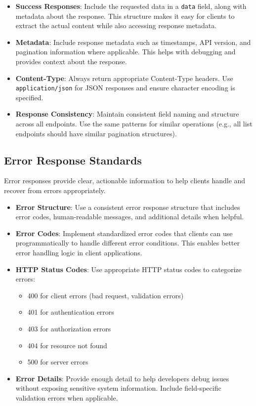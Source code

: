 \documentclass[12pt]{article}
\begin{document}
\begin{itemize}
    \item \textbf{Success Responses}: Include the requested data in a \texttt{data} field, along with metadata about the response. This structure makes it easy for clients to extract the actual content while also accessing response metadata.
    
    \item \textbf{Metadata}: Include response metadata such as timestamps, API version, and pagination information where applicable. This helps with debugging and provides context about the response.
    
    \item \textbf{Content-Type}: Always return appropriate Content-Type headers. Use \texttt{application/json} for JSON responses and ensure character encoding is specified.
    
    \item \textbf{Response Consistency}: Maintain consistent field naming and structure across all endpoints. Use the same patterns for similar operations (e.g., all list endpoints should have similar pagination structures).
\end{itemize}

\subsection{Error Response Standards}
Error responses provide clear, actionable information to help clients handle and recover from errors appropriately.

\begin{itemize}
    \item \textbf{Error Structure}: Use a consistent error response structure that includes error codes, human-readable messages, and additional details when helpful.
    
    \item \textbf{Error Codes}: Implement standardized error codes that clients can use programmatically to handle different error conditions. This enables better error handling logic in client applications.
    
    \item \textbf{HTTP Status Codes}: Use appropriate HTTP status codes to categorize errors:
    \begin{itemize}
        \item 400 for client errors (bad request, validation errors)
        \item 401 for authentication errors
        \item 403 for authorization errors
        \item 404 for resource not found
        \item 500 for server errors
    \end{itemize}
    
    \item \textbf{Error Details}: Provide enough detail to help developers debug issues without exposing sensitive system information. Include field-specific validation errors when applicable.
\end{itemize}
\end{document}
